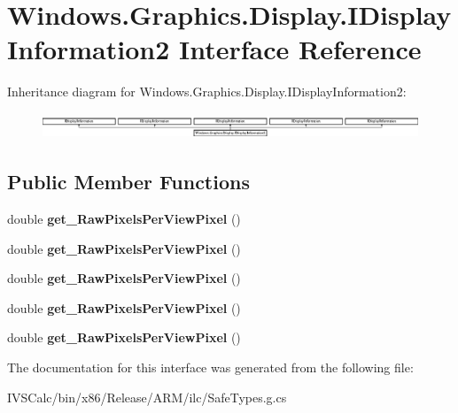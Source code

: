 \hypertarget{interface_windows_1_1_graphics_1_1_display_1_1_i_display_information2}{}\section{Windows.\+Graphics.\+Display.\+I\+Display\+Information2 Interface Reference}
\label{interface_windows_1_1_graphics_1_1_display_1_1_i_display_information2}
Inheritance diagram for Windows.\+Graphics.\+Display.\+I\+Display\+Information2\+:\begin{figure}[H]
\begin{center}
\leavevmode
\includegraphics[height=0.775087cm]{interface_windows_1_1_graphics_1_1_display_1_1_i_display_information2}
\end{center}
\end{figure}
\subsection*{Public Member Functions}
\begin{DoxyCompactItemize}
\item 
\mbox{\label{interface_windows_1_1_graphics_1_1_display_1_1_i_display_information2_a979cec8e0a5acb9c848bf8183f8d0cbc}} 
double {\bfseries get\+\_\+\+Raw\+Pixels\+Per\+View\+Pixel} ()
\item 
\mbox{\label{interface_windows_1_1_graphics_1_1_display_1_1_i_display_information2_a979cec8e0a5acb9c848bf8183f8d0cbc}} 
double {\bfseries get\+\_\+\+Raw\+Pixels\+Per\+View\+Pixel} ()
\item 
\mbox{\label{interface_windows_1_1_graphics_1_1_display_1_1_i_display_information2_a979cec8e0a5acb9c848bf8183f8d0cbc}} 
double {\bfseries get\+\_\+\+Raw\+Pixels\+Per\+View\+Pixel} ()
\item 
\mbox{\label{interface_windows_1_1_graphics_1_1_display_1_1_i_display_information2_a979cec8e0a5acb9c848bf8183f8d0cbc}} 
double {\bfseries get\+\_\+\+Raw\+Pixels\+Per\+View\+Pixel} ()
\item 
\mbox{\label{interface_windows_1_1_graphics_1_1_display_1_1_i_display_information2_a979cec8e0a5acb9c848bf8183f8d0cbc}} 
double {\bfseries get\+\_\+\+Raw\+Pixels\+Per\+View\+Pixel} ()
\end{DoxyCompactItemize}


The documentation for this interface was generated from the following file\+:\begin{DoxyCompactItemize}
\item 
I\+V\+S\+Calc/bin/x86/\+Release/\+A\+R\+M/ilc/Safe\+Types.\+g.\+cs\end{DoxyCompactItemize}
